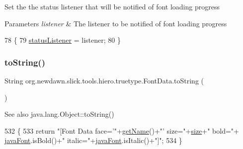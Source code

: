 Set the the status listener that will be notified of font loading progress


\begin{DoxyParams}{Parameters}
{\em listener} & The listener to be notified of font loading progress \\
\hline
\end{DoxyParams}

\begin{DoxyCode}
78                                                                   \{
79         \mbox{\hyperlink{classorg_1_1newdawn_1_1slick_1_1tools_1_1hiero_1_1truetype_1_1_font_data_aa1e117e156dc915030130f6e37336246}{statusListener}} = listener;
80     \}
\end{DoxyCode}
\mbox{\label{classorg_1_1newdawn_1_1slick_1_1tools_1_1hiero_1_1truetype_1_1_font_data_a452e44a300086abeb9da1430bd7c1941}} 
\subsubsection{\texorpdfstring{to\+String()}{toString()}}
{\footnotesize\ttfamily String org.\+newdawn.\+slick.\+tools.\+hiero.\+truetype.\+Font\+Data.\+to\+String (\begin{DoxyParamCaption}{ }\end{DoxyParamCaption})\hspace{0.3cm}{\ttfamily [inline]}}

\begin{DoxySeeAlso}{See also}
java.\+lang.\+Object\+::to\+String() 
\end{DoxySeeAlso}

\begin{DoxyCode}
532                              \{
533         \textcolor{keywordflow}{return} \textcolor{stringliteral}{"[Font Data face='"}+\mbox{\hyperlink{classorg_1_1newdawn_1_1slick_1_1tools_1_1hiero_1_1truetype_1_1_font_data_a68cb4ad825dd0c861f8019e47319b6a1}{getName}}()+\textcolor{stringliteral}{"' size="}+\mbox{\hyperlink{classorg_1_1newdawn_1_1slick_1_1tools_1_1hiero_1_1truetype_1_1_font_data_a96af538e2a7368fdba46ffc2ad6a9a0e}{size}}+\textcolor{stringliteral}{" bold="}+
      \mbox{\hyperlink{classorg_1_1newdawn_1_1slick_1_1tools_1_1hiero_1_1truetype_1_1_font_data_ab48e0ef57ae93083499407b9998d93a6}{javaFont}}.isBold()+\textcolor{stringliteral}{" italic="}+\mbox{\hyperlink{classorg_1_1newdawn_1_1slick_1_1tools_1_1hiero_1_1truetype_1_1_font_data_ab48e0ef57ae93083499407b9998d93a6}{javaFont}}.isItalic()+\textcolor{stringliteral}{"]"};
534     \}
\end{DoxyCode}


